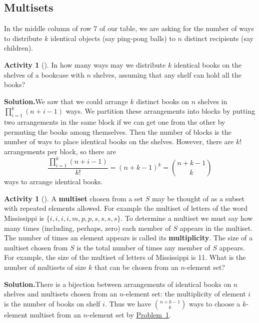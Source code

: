 \documentclass[10pt,]{book}
\newcommand{\terminology}[1]{\textbf{#1}}
\theoremstyle{plain}
\theoremstyle{definition}
\newtheorem{activity}[project]{Activity}
\numberwithin{equation}{chapter}
\begin{document}
\subsection[{Multisets}]{Multisets}\label{subsection-32}
In the middle column of row 7 of our table, we are asking for the number of ways to distribute \(k\) identical objects (say ping-pong balls) to \(n\) distinct recipients (say children).%
\begin{activity}[]\label{identicalbooks}
In how many ways may we distribute \(k\) identical books on the shelves of a bookcase with \(n\) shelves, assuming that any shelf can hold all the books?%
\par\medskip\noindent%
\textbf{Solution.}\quad We saw that we could arrange \(k\) distinct books on \(n\) shelves in \(\prod_{i=1}^k (n+i-1)\) ways. We partition these arrangements into blocks by putting two arrangements in the same block if we can get one from the other by permuting the books among themselves. Then the number of blocks is the number of ways to place identical books on the shelves. However, there are \(k!\) arrangements per block, so there are%
\begin{equation*}
\frac{\prod_{i=1}^k (n+i-1)}{k!}=(n+k-1)^{\underline{k}}= \binom{n+k-1}{k}
\end{equation*}
ways to arrange identical books.%
\end{activity}
\begin{activity}[]\label{multiset}
A \terminology{multiset} chosen from a set \(S\) may be thought of as a subset with repeated elements allowed. For example the multiset of letters of the word Mississippi is \(\{i,i,i,i,m,p,p,s,s,s,s\}\). To determine a multiset we must say how many times (including, perhaps, zero) each member of \(S\) appears in the multiset. The number of times an element appears is called its \terminology{multiplicity}. The size of a multiset chosen from \(S\) is the total number of times any member of \(S\) appears. For example, the size of the multiset of letters of Mississippi is 11. What is the number of multisets of size \(k\) that can be chosen from an \(n\)-element set?%
\par\medskip\noindent%
\textbf{Solution.}\quad There is a bijection between arrangements of identical books on \(n\) shelves and multisets chosen from an \(n\)-element set: the multiplicity of element \(i\) is the number of books on shelf \(i\). Thus we have \(\binom{n+k-1}{k}\) ways to choose a \(k\)-element multiset from an \(n\)-element set by \hyperref[identicalbooks]{Problem~\ref{identicalbooks}}.%
\end{activity}
\end{document}
